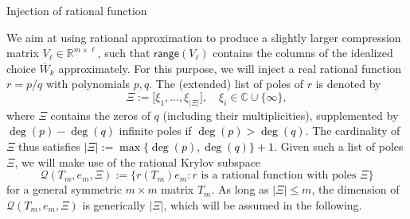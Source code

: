 \documentclass{siamart190516}
\newcommand{\defi}{:=}
\newcommand{\R}{\mathbb{R}}
\newcommand{\range}{\mathsf{range}}
\providecommand{\abs}[1]{\lvert#1\rvert}
\providecommand{\edit}[1]{\textcolor{black}{#1}}
\begin{document}
\begin{paragraph}{Injection of rational function}

We aim at using rational approximation to produce a slightly larger compression matrix $V_{\ell} \in \R^{m\times \ell}$, such that $\range(V_{\ell})$ contains the columns of the idealized choice $\overline{W}_{k}$ approximately. For this purpose, we will inject a real rational function $r = p/q$ with polynomials $p,q$. The (extended) list of poles of $r$ is denoted by
\[
 \Xi \defi \big[\xi_{1},\dotsc,\xi_{\abs{\Xi}}\big], \quad \xi_i \in \mathbb C \cup \{\infty\},
\]
where $\Xi$ contains the zeros of $q$ (including their multiplicities), supplemented by \edit{$\deg(p) - \deg(q)$} infinite poles if \edit{$\deg(p) > \deg(q)$.} The cardinality of $\Xi$ thus satisfies \edit{$\abs{\Xi} \defi \max\{\deg(p), \deg(q)\}+1$.} Given such a list of poles $\Xi$, we will make use of the 
rational Krylov subspace
\begin{equation}
    \mathcal{Q}(T_{m},e_m,\Xi)  \defi \bigl\{ r(T_m)e_m \colon \text{$r$ is a rational function with poles $\Xi$} \bigr\}   \label{eq:ratkrylov}
\end{equation}
for a general symmetric $m\times m$ matrix $T_m$.
As long as $\abs{\Xi} \le m$, the dimension of $\mathcal{Q}(T_{m},e_m,\Xi)$ is generically $\abs{\Xi}$, which will be assumed in the following.


\end{paragraph}
\end{document}
